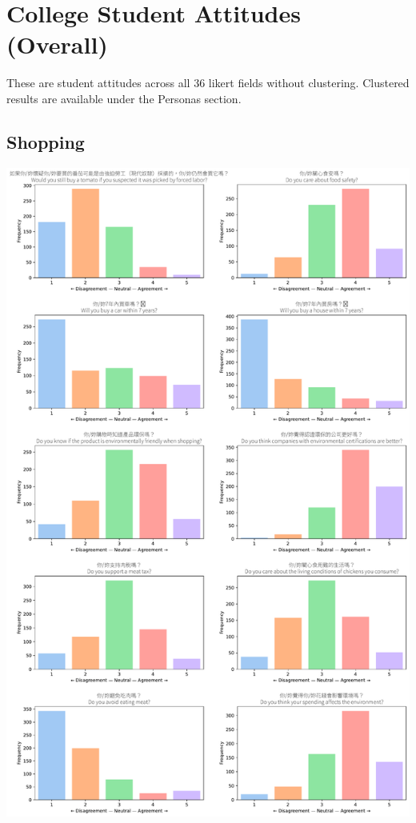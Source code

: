 \documentclass[
  letterpaper,
  DIV=11,
  numbers=noendperiod]{scrartcl}
\begin{document}
\section{College Student Attitudes
(Overall)}\label{college-student-attitudes-overall}

These are student attitudes across all 36 likert fields without
clustering. Clustered results are available under the Personas section.

\subsection{Shopping}\label{shopping-2}

\includegraphics{_thesis_files/figure-pdf/cell-11-output-1.pdf}
\end{document}
